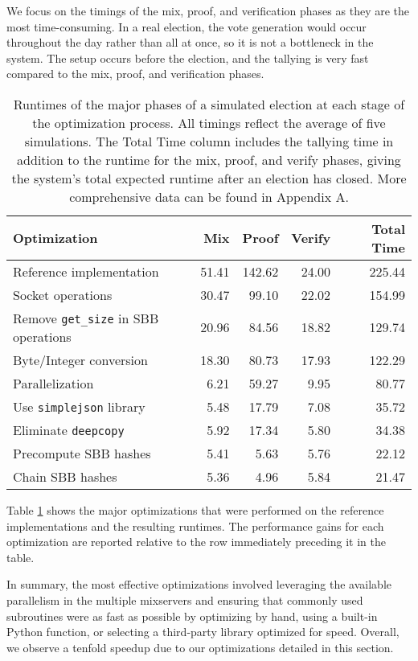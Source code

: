 We focus on the timings of the mix, proof, and verification phases as they are the most time-consuming. In a real election, the vote generation would occur throughout the day rather than all at once, so it is not a bottleneck in the system. The setup occurs before the election, and the tallying is very fast compared to the mix, proof, and verification phases.

\begin{table}[htbp]
\centering
\begin{tabular}{l | r | r | r || r}
  \textbf{Optimization} & \textbf{Mix} & \textbf{Proof} & \textbf{Verify} & \textbf{Total Time} \\
  \hline
  Reference implementation & 51.41 & 142.62 & 24.00 & 225.44 \\
  Socket operations & 30.47 & 99.10 & 22.02 & 154.99 \\
  Remove \texttt{get\_size} in SBB operations & 20.96 & 84.56 & 18.82 & 129.74 \\
  Byte/Integer conversion & 18.30 & 80.73 & 17.93 & 122.29 \\
  Parallelization & 6.21 & 59.27 & 9.95 & 80.77 \\
  Use \texttt{simplejson} library & 5.48 & 17.79 & 7.08 & 35.72 \\
  Eliminate \texttt{deepcopy} & 5.92 & 17.34 & 5.80 & 34.38 \\
  Precompute SBB hashes & 5.41 & 5.63 & 5.76 & 22.12 \\
  Chain SBB hashes & 5.36 & 4.96 & 5.84 & 21.47
\end{tabular}
\caption[Election runtime at each stage of optimization]{Runtimes of the major phases of a simulated election at each stage of the optimization process. All timings reflect the average of five simulations. The Total Time column includes the tallying time in addition to the runtime for the mix, proof, and verify phases, giving the system's total expected runtime after an election has closed. More comprehensive data can be found in Appendix A.}
\label{table:perf:optimizations}
\end{table}

Table \ref{table:perf:optimizations} shows the major optimizations that were performed on the reference implementations and the resulting runtimes. The performance gains for each optimization are reported relative to the row immediately preceding it in the table.

In summary, the most effective optimizations involved leveraging the available parallelism in the multiple mixservers and ensuring that commonly used subroutines were as fast as possible by optimizing by hand, using a built-in Python function, or selecting a third-party library optimized for speed. Overall, we observe a tenfold speedup due to our optimizations detailed in this section.

